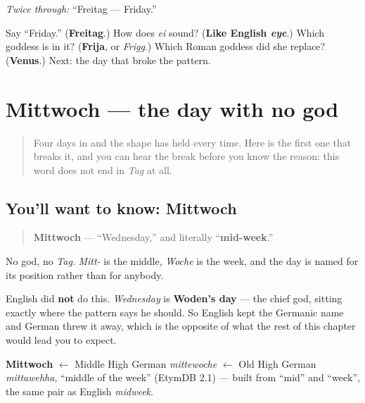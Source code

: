 \emph{Twice through:} \textquotedblleft{}Freitag — Friday.\textquotedblright{}

\begin{tcolorbox}[breakable,colback=teal!4,colframe=teal!35!black,title={Before you move on}]
Say \textquotedblleft{}Friday.\textquotedblright{} (\textbf{Freitag}.) How does \emph{ei} sound? (\textbf{Like English \emph{eye}}.) Which goddess is in it? (\textbf{Frija}, or \emph{Frigg}.) Which Roman goddess did she replace? (\textbf{Venus}.) Next: the day that broke the pattern.
\end{tcolorbox}
\section[Mittwoch]{Mittwoch — the day with no god}

\label{lesson:GE-C07-mittwoch}



\begin{quote}
Four days in and the shape has held every time. Here is the first one that breaks it, and you can hear the break before you know the reason: this word does not end in \emph{Tag} at all.
\end{quote}

\subsection*{You'll want to know: Mittwoch}
\begin{quote}
\textbf{Mittwoch} — \textquotedblleft{}Wednesday,\textquotedblright{} and literally \textquotedblleft{}\textbf{mid-week}.\textquotedblright{}
\end{quote}

No god, no \emph{Tag}. \emph{Mitt-} is the middle, \emph{Woche} is the week, and the day is named for its position rather than for anybody.

English did \textbf{not} do this. \emph{Wednesday} is \textbf{Woden's day} — the chief god, sitting exactly where the pattern says he should. So English kept the Germanic name and German threw it away, which is the opposite of what the rest of this chapter would lead you to expect.

\begin{cousinweb}
\textbf{Mittwoch} $\leftarrow$ Middle High German \emph{mittewoche} $\leftarrow$ Old High German \emph{mittawehha}, \textquotedblleft{}middle of the week\textquotedblright{} (EtymDB 2.1) — built from \textquotedblleft{}mid\textquotedblright{} and \textquotedblleft{}week\textquotedblright{}, the same pair as English \emph{midweek}.
\end{cousinweb}


